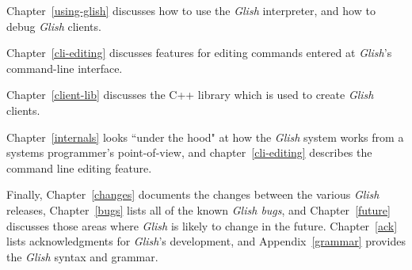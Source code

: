Chapter~\ref{using-glish} discusses how to use the {\em Glish} interpreter,
and how to debug {\em Glish} clients.

Chapter~\ref{cli-editing} discusses features for editing
commands entered at {\em Glish}'s command-line interface.

Chapter~\ref{client-lib} discusses the C++ library which is used to create
{\em Glish} clients.

Chapter~\ref{internals} looks ``under the hood" at how the {\em Glish}
system works from a systems programmer's point-of-view, and
chapter~\ref{cli-editing} describes the command line editing
feature.

Finally, Chapter~\ref{changes} documents the changes between the various
{\em Glish} releases, Chapter~\ref{bugs} lists all of the known {\em Glish bugs}, and
Chapter~\ref{future} discusses those areas where {\em Glish} is likely to change
in the future.  Chapter~\ref{ack} lists acknowledgments for {\em Glish}'s
development, and Appendix~\ref{grammar} provides the {\em Glish} syntax and
grammar.
